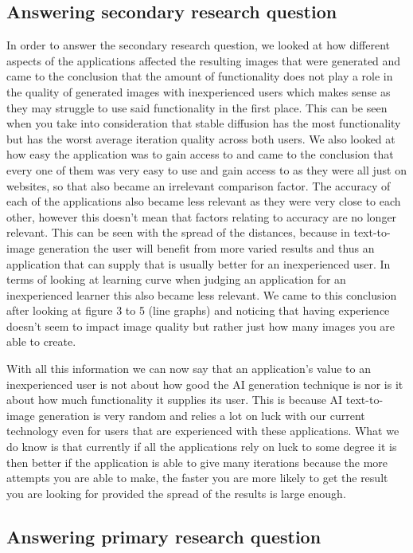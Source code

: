 \documentclass[]{report}
\begin{document}
	\subsection{Answering secondary research question}
	
	In order to answer the secondary research question, we looked at how different aspects of the applications affected the resulting images that were generated and came to the conclusion that the amount of functionality does not play a role in the quality of generated images with inexperienced users which makes sense as they may struggle to use said functionality in the first place. This can be seen when you take into consideration that stable diffusion has the most functionality but has the worst average iteration quality across both users. 
	We also looked at how easy the application was to gain access to and came to the conclusion that every one of them was very easy to use and gain access to as they were all just on websites, so that also became an irrelevant comparison factor.
	The accuracy of each of the applications also became less relevant as they were very close to each other, however this doesn't mean that factors relating to accuracy are no longer relevant. This can be seen with the spread of the distances, because in text-to-image generation the user will benefit from more varied results and thus an application that can supply that is usually better for an inexperienced user.
	In terms of looking at learning curve when judging an application for an inexperienced learner this also became less relevant. We came to this conclusion after looking at figure 3 to 5 (line graphs) and noticing that having experience doesn't seem to impact image quality but rather just how many images you are able to create.
	
	
	With all this information we can now say that an application's value to an inexperienced user is not about how good the AI generation technique is nor is it about how much functionality it supplies its user. This is because AI text-to-image generation is very random and relies a lot on luck with our current technology even for users that are experienced with these applications. What we do know is that currently if all the applications rely on luck to some degree it is then better if the application is able to give many iterations because the more attempts you are able to make, the faster you are more likely to get the result you are looking for provided the spread of the results is large enough. 
	
	\subsection{Answering primary research question}
	
\end{document}
